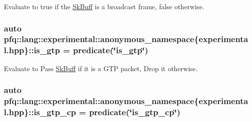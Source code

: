 Evaluate to {\ttfamily true} if the \hyperlink{structpfq_1_1lang_1_1SkBuff}{Sk\+Buff} is a broadcast frame, {\ttfamily false} otherwise. 

\subsubsection[{\texorpdfstring{is\+\_\+gtp}{is_gtp}}]{\setlength{\rightskip}{0pt plus 5cm}auto pfq\+::lang\+::experimental\+::anonymous\+\_\+namespace\{experimental.\+hpp\}\+::is\+\_\+gtp = {\bf predicate}(\char`\"{}is\+\_\+gtp\char`\"{})}\hypertarget{namespacepfq_1_1lang_1_1experimental_1_1anonymous__namespace_02experimental_8hpp_03_a2eb9e54a6fc6170b246cf3149445a2c4}{}\label{namespacepfq_1_1lang_1_1experimental_1_1anonymous__namespace_02experimental_8hpp_03_a2eb9e54a6fc6170b246cf3149445a2c4}


Evaluate to {\ttfamily Pass} \hyperlink{structpfq_1_1lang_1_1SkBuff}{Sk\+Buff} if it is a G\+TP packet, {\ttfamily Drop} it otherwise. 

\subsubsection[{\texorpdfstring{is\+\_\+gtp\+\_\+cp}{is_gtp_cp}}]{\setlength{\rightskip}{0pt plus 5cm}auto pfq\+::lang\+::experimental\+::anonymous\+\_\+namespace\{experimental.\+hpp\}\+::is\+\_\+gtp\+\_\+cp = {\bf predicate}(\char`\"{}is\+\_\+gtp\+\_\+cp\char`\"{})}\hypertarget{namespacepfq_1_1lang_1_1experimental_1_1anonymous__namespace_02experimental_8hpp_03_ade25d79513e3131a54a05e23d25a7539}{}\label{namespacepfq_1_1lang_1_1experimental_1_1anonymous__namespace_02experimental_8hpp_03_ade25d79513e3131a54a05e23d25a7539}


